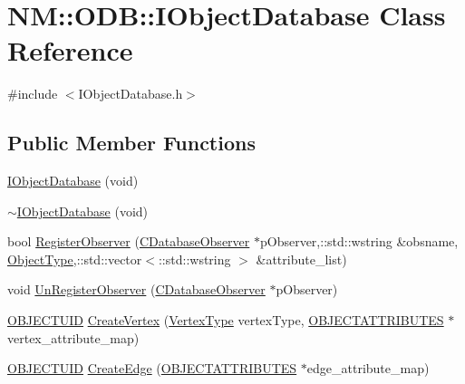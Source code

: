 \hypertarget{class_n_m_1_1_o_d_b_1_1_i_object_database}{}\section{N\+M\+:\+:O\+D\+B\+:\+:I\+Object\+Database Class Reference}
\label{class_n_m_1_1_o_d_b_1_1_i_object_database}


{\ttfamily \#include $<$I\+Object\+Database.\+h$>$}

\subsection*{Public Member Functions}
\begin{DoxyCompactItemize}
\item 
\hyperlink{class_n_m_1_1_o_d_b_1_1_i_object_database_a8fcf7cc3fa9265d5c82851e574b0ccc1}{I\+Object\+Database} (void)
\item 
\hyperlink{class_n_m_1_1_o_d_b_1_1_i_object_database_a80e994be7dd82a47561eb35227b3dbc7}{$\sim$\+I\+Object\+Database} (void)
\item 
bool \hyperlink{class_n_m_1_1_o_d_b_1_1_i_object_database_a922a235f0ece8aadb7f4927e192b82a1}{Register\+Observer} (\hyperlink{class_n_m_1_1_o_d_b_1_1_c_database_observer}{C\+Database\+Observer} $\ast$p\+Observer,\+::std\+::wstring \&obsname, \hyperlink{namespace_n_m_1_1_o_d_b_ac9f60beb4a1c8a6240dd0c8baa281345}{Object\+Type},\+::std\+::vector$<$\+::std\+::wstring $>$ \&attribute\+\_\+list)
\item 
void \hyperlink{class_n_m_1_1_o_d_b_1_1_i_object_database_a7354bdd24c0e4edce69b1dad0fc3d36a}{Un\+Register\+Observer} (\hyperlink{class_n_m_1_1_o_d_b_1_1_c_database_observer}{C\+Database\+Observer} $\ast$p\+Observer)
\item 
\hyperlink{namespace_n_m_1_1_o_d_b_a262b64fab56baaa96e18bac4ada88265}{O\+B\+J\+E\+C\+T\+U\+I\+D} \hyperlink{class_n_m_1_1_o_d_b_1_1_i_object_database_a85b6724d2cb2f47bcdcbacbec8a61dc7}{Create\+Vertex} (\hyperlink{namespace_n_m_1_1_o_d_b_a74e0c94daaeea6f7e783c03a8c921022}{Vertex\+Type} vertex\+Type, \hyperlink{namespace_n_m_1_1_o_d_b_a8770283da9792324e1afe8104d40123b}{O\+B\+J\+E\+C\+T\+A\+T\+T\+R\+I\+B\+U\+T\+E\+S} $\ast$vertex\+\_\+attribute\+\_\+map)
\item 
\hyperlink{namespace_n_m_1_1_o_d_b_a262b64fab56baaa96e18bac4ada88265}{O\+B\+J\+E\+C\+T\+U\+I\+D} \hyperlink{class_n_m_1_1_o_d_b_1_1_i_object_database_acc11ae10eb71160e4a388f7f3fe9416f}{Create\+Edge} (\hyperlink{namespace_n_m_1_1_o_d_b_a8770283da9792324e1afe8104d40123b}{O\+B\+J\+E\+C\+T\+A\+T\+T\+R\+I\+B\+U\+T\+E\+S} $\ast$edge\+\_\+attribute\+\_\+map)

\end{DoxyCompactItemize}

